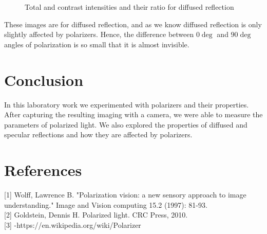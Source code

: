\documentclass[english]{article}
\begin{document}
\begin{figure}[H]
	\centering
	\caption{Total and contrast intensities and their ratio for diffused reflection}
	\label{fig:eleven}
\end{figure}
These images are for diffused reflection, and as we know diffused reflection is only slightly affected by polarizers.
Hence, the difference between $0\deg$ and $90\deg$ angles of polarization is so small that it is almost invisible.
\section{Conclusion}
In this laboratory work we experimented with polarizers and their properties. 
After capturing the resulting imaging with a camera, we were able to measure the parameters of polarized light.
We also explored the properties of diffused and specular reflections and how they are affected by polarizers.

\section{References}
{[}1{]} Wolff, Lawrence B. "Polarization vision: a new sensory approach to image understanding." Image and Vision computing 15.2 (1997): 81-93.\\
{[}2{]} Goldstein, Dennis H. Polarized light. CRC Press, 2010.\\
{[}3{]} -https://en.wikipedia.org/wiki/Polarizer\\
\end{document}
